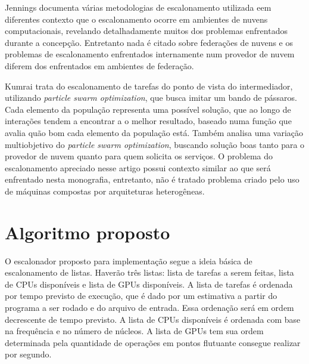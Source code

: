 Jennings\cite{Jennings:2015:RMC:2793474.2793493} documenta  várias metodologias de escalonamento utilizada eem diferentes contexto que o escalonamento ocorre em ambientes de nuvens computacionais, revelando detalhadamente muitos dos problemas enfrentados durante a concepção. Entretanto nada é citado sobre federações de nuvens e os problemas de escalonamento enfrentados internamente num provedor de nuvem diferem dos enfrentados em ambientes de federação.

Kumrai\cite{7467407} trata do escalonamento de tarefas do ponto de vista do intermediador, utilizando \textit{particle swarm optimization}, que busca imitar um bando de pássaros. Cada elemento da população representa uma possível solução, que ao longo de interações tendem a encontrar a o melhor resultado, baseado numa função que avalia quão bom cada elemento da população está. Também analisa uma variação multiobjetivo do \textit{particle swarm optimization}, buscando solução boas tanto para o provedor de nuvem quanto para quem solicita os serviços. O problema do escalonamento apreciado nesse artigo possui contexto similar ao que será enfrentado nesta monografia, entretanto, não é tratado problema criado pelo uso de máquinas compostas por arquiteturas heterogêneas.

\section{Algoritmo proposto}

O escalonador proposto para implementação segue a ideia básica de escalonamento de listas. Haverão três listas: lista de tarefas a serem feitas, lista de \acrshort{CPU}s disponíveis e lista de \acrshort{GPU}s disponíveis.
A lista de tarefas é ordenada por tempo previsto de execução, que é dado por um estimativa a partir do programa a ser rodado e do arquivo de entrada. Essa ordenação será em ordem decrescente de tempo previsto. A lista de \acrshort{CPU}s disponíveis é ordenada com base na frequência e no número de núcleos. A lista de \acrshort{GPU}s tem sua ordem determinada pela quantidade de operações em pontos flutuante consegue realizar por segundo.

